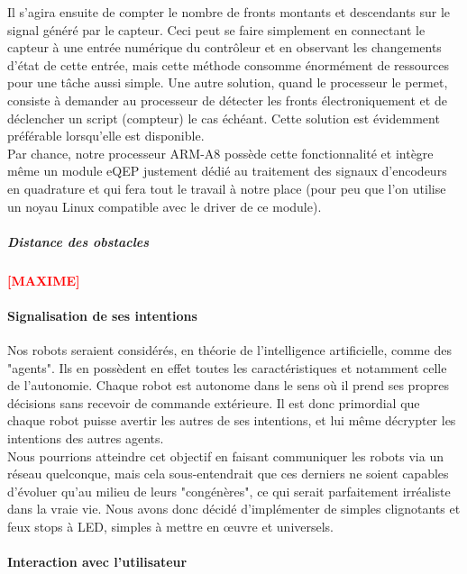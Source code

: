 				Il s'agira ensuite de compter le nombre de fronts montants et descendants sur le signal généré par le capteur.
				Ceci peut se faire simplement en connectant le capteur à une entrée numérique du contrôleur et en observant les changements d'état de cette entrée, mais cette méthode consomme énormément de ressources pour une tâche aussi simple. Une autre solution, quand le processeur le permet, consiste à demander au processeur de détecter les fronts électroniquement et de déclencher un script (compteur) le cas échéant. Cette solution est évidemment préférable lorsqu'elle est disponible.\\

				Par chance, notre processeur ARM-A8 possède cette fonctionnalité et intègre même un module eQEP\cite{bib12}  justement dédié au traitement des signaux d'encodeurs en quadrature et qui fera tout le travail à notre place (pour peu que l'on utilise un noyau Linux compatible avec le driver de ce module).

			\subparagraph*{Distance des obstacles}

				\textbf{\huge{\textcolor{red}{[MAXIME]}}}

		\paragraph{Signalisation de ses intentions}

			Nos robots seraient considérés, en théorie de l'intelligence artificielle, comme des "agents". Ils en possèdent en effet toutes les caractéristiques et notamment celle de l'autonomie. Chaque robot est autonome dans le sens où il prend ses propres décisions sans recevoir de commande extérieure. Il est donc primordial que chaque robot puisse avertir les autres de ses intentions, et lui même décrypter les intentions des autres agents.\\

			Nous pourrions atteindre cet objectif en faisant communiquer les robots via un réseau quelconque, mais cela sous-entendrait que ces derniers ne soient capables d'évoluer qu'au milieu de leurs "congénères", ce qui serait parfaitement irréaliste dans la vraie vie. Nous avons donc décidé d'implémenter de simples clignotants et feux stops à LED, simples à mettre en œuvre et universels.

		\paragraph{Interaction avec l'utilisateur}

